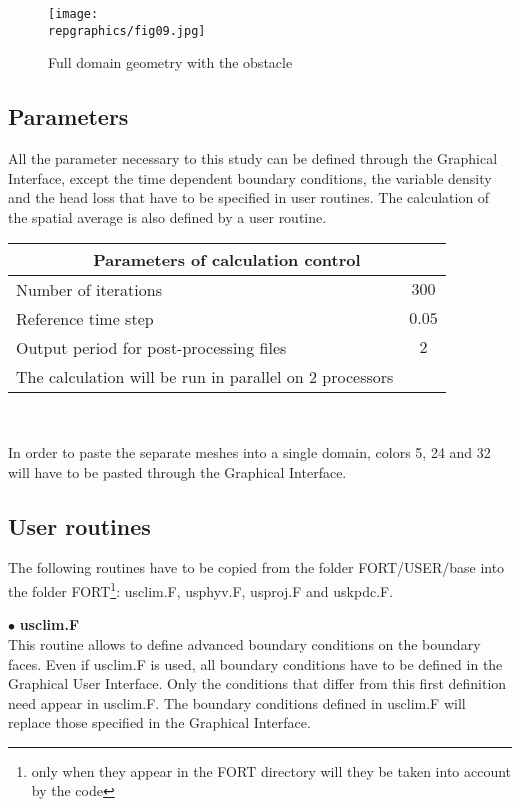 \begin{figure}[h!]
\begin{center}
\texttt{[image: \\repgraphics/fig09.jpg]}
\caption{Full domain geometry with the obstacle}
\label{figante41}
\end{center}
\end{figure}



        \subsection{Parameters}

All the parameter necessary to this study can be defined through the Graphical
Interface, except the time dependent boundary conditions, the variable
density and the head loss that have to be specified in user routines. The
calculation of the spatial average is also defined by a user routine.


\begin{center}
\begin{tabular}{|l|c|}
\hline
\multicolumn{2}{|c|}{Parameters of calculation control} \\
\hline
Number of iterations & $300$ \\
\hline
Reference time step & $0.05$ \\
\hline
Output period for post-processing files& $2$ \\
\hline
The calculation will be run in parallel on 2 processors \\
\end{tabular}\\
\end{center}

In order to paste the separate meshes into a single domain, colors 5, 24 and 32
will have to be pasted through the Graphical Interface.


        \subsection{User routines}

The following routines have to be copied from the folder FORT/USER/base into the
folder FORT\footnote{only when they appear in the FORT directory will they be
taken into account by the code}: usclim.F, usphyv.F, usproj.F and uskpdc.F.

$\bullet$ {\bfseries usclim.F}\\
This routine allows to define advanced boundary conditions on the boundary
faces. Even if usclim.F is used, all boundary conditions have to be defined in
the Graphical User Interface. Only the conditions that differ from this first
definition need appear in usclim.F. The boundary conditions defined in usclim.F
will replace those specified in the Graphical Interface.

